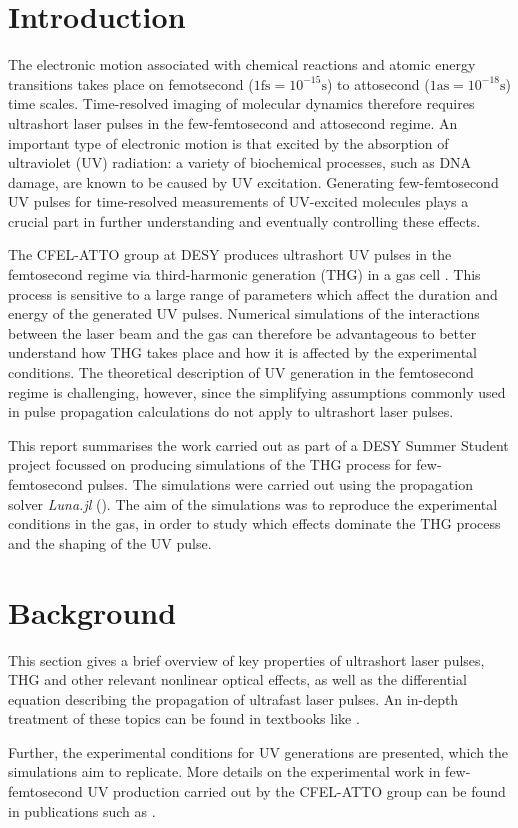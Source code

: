 \documentclass[a4paper]{jpconf}
\begin{document}
\section{Introduction}
The electronic motion associated with chemical reactions and atomic energy transitions takes place on femotsecond ($1 \text{fs} = 10^{-15} \text{s}$) to attosecond ($1 \text{as} = 10^{-18} \text{s}$) time scales. Time-resolved imaging of molecular dynamics therefore requires ultrashort laser pulses in the few-femtosecond and attosecond regime. An important type of electronic motion is that excited by the absorption of ultraviolet (UV) radiation: a variety of biochemical processes, such as DNA damage, are known to be caused by UV excitation. Generating few-femtosecond UV pulses for time-resolved measurements of UV-excited molecules plays a crucial part in further understanding and eventually controlling these effects. \par 
The CFEL-ATTO group at DESY produces ultrashort UV pulses in the femtosecond regime via third-harmonic generation (THG) in a gas cell \cite{galli2019}. This process is sensitive to a large range of parameters which affect the duration and energy of the generated UV pulses. Numerical simulations of the interactions between the laser beam and the gas can therefore be advantageous to better understand how THG takes place and how it is affected by the experimental conditions. The theoretical description of UV generation in the femtosecond regime is challenging, however, since the simplifying assumptions commonly used in pulse propagation calculations do not apply to ultrashort laser pulses. \par 
This report summarises the work carried out as part of a DESY Summer Student project focussed on producing simulations of the THG process for few-femtosecond pulses. The simulations were carried out using the propagation solver \textit{Luna.jl} (\cite{brahms2023}). The aim of the simulations was to reproduce the experimental conditions in the gas, in order to study which effects dominate the THG process and the shaping of the UV pulse. 

\section{Background}
This section gives a brief overview of key properties of ultrashort laser pulses,  THG and other relevant nonlinear optical effects, as well as the differential equation describing the propagation of ultrafast laser pulses. An in-depth treatment of these topics can be found in textbooks like \cite{keller2021, new2011}. \par 
Further, the experimental conditions for UV generations are presented, which the simulations aim to replicate. More details on the experimental work in few-femtosecond UV production carried out by the CFEL-ATTO group can be found in publications such as \cite{galli2019}. 
\end{document}

